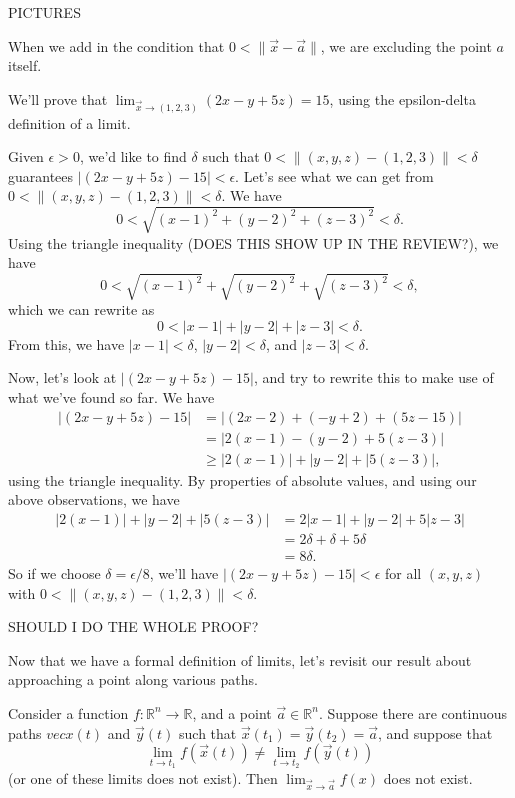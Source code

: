 \documentclass{ximera}
\begin{document}
PICTURES

When we add in the condition that $0<\|\vec{x}-\vec{a}\|$, we are excluding the point $a$ itself.

\begin{example}
We'll prove that $\lim_{\vec{x}\rightarrow (1,2,3)} (2x-y+5z) = 15$, using the epsilon-delta definition of a limit.

Given $\epsilon >0$, we'd like to find $\delta$ such that $0< \|(x,y,z)-(1,2,3)\|<\delta$ guarantees $|(2x-y+5z)-15|<\epsilon$. Let's see what we can get from $0< \|(x,y,z)-(1,2,3)\|<\delta$. We have
\[
0< \sqrt{(x-1)^2+(y-2)^2+(z-3)^2}<\delta.
\]
Using the triangle inequality (DOES THIS SHOW UP IN THE REVIEW?), we have
\[
0< \sqrt{(x-1)^2}+\sqrt{(y-2)^2}+\sqrt{(z-3)^2}<\delta,
\]
which we can rewrite as
\[
0< |x-1|+|y-2|+|z-3|<\delta.
\]
From this, we have $|x-1|<\delta$, $|y-2|<\delta$, and $|z-3|<\delta$.

Now, let's look at $|(2x-y+5z)-15|$, and try to rewrite this to make use of what we've found so far. We have
\begin{align*}
 |(2x-y+5z)-15| &=|(2x-2)+(-y+2)+(5z-15)|\\
&=|2(x-1)-(y-2)+5(z-3)|\\
&\geq |2(x-1)|+|y-2|+|5(z-3)|,
\end{align*}
using the triangle inequality. By properties of absolute values, and using our above observations, we have
\begin{align*}
|2(x-1)|+|y-2|+|5(z-3)| &= 2|x-1|+|y-2|+5|z-3|\\
&=2\delta + \delta + 5\delta\\
&=8\delta.
\end{align*}
So if we choose $\delta = \epsilon/8$, we'll have $|(2x-y+5z)-15|<\epsilon$ for all $(x,y,z)$ with $0< \|(x,y,z)-(1,2,3)\|<\delta$.

SHOULD I DO THE WHOLE PROOF?
\end{example}

Now that we have a formal definition of limits, let's revisit our result about approaching a point along various paths.

\begin{proposition}
Consider a function $f:\mathbb{R}^n\rightarrow \mathbb{R}$, and a point $\vec{a}\in\mathbb{R}^n$. Suppose there are continuous paths $vec{x}(t)$ and $\vec{y}(t)$ such that $\vec{x}(t_1) = \vec{y}(t_2) = \vec{a}$, and suppose that
\[
\lim_{t\rightarrow t_1}f(\vec{x}(t))\neq \lim_{t\rightarrow t_2}f(\vec{y}(t))
\]
(or one of these limits does not exist). Then $\lim_{\vec{x}\rightarrow\vec{a}}f(x)$ does not exist.
\end{proposition}
\end{document}
